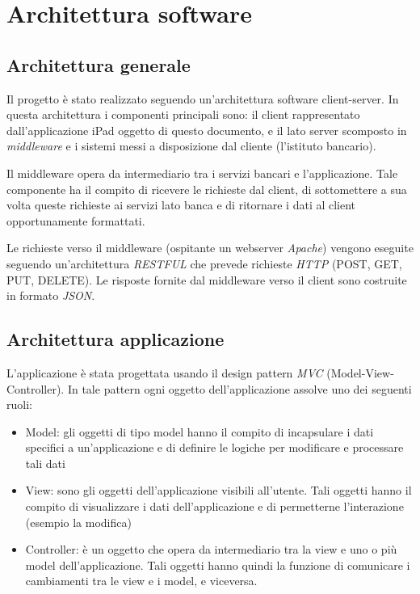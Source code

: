 \chapter{Architettura software}


\section{Architettura generale}

Il progetto è stato realizzato seguendo un'architettura software client-server. In questa architettura i componenti principali sono: il client rappresentato dall'applicazione iPad oggetto di questo documento, e il lato server scomposto in \emph{middleware} e i sistemi messi a disposizione dal cliente (l'istituto bancario).

Il middleware opera da intermediario tra i servizi bancari e l'applicazione. Tale componente ha il compito di ricevere le richieste dal client, di sottomettere a sua volta queste richieste ai servizi lato banca e di ritornare i dati al client opportunamente formattati.

Le richieste verso il middleware (ospitante un webserver \emph{Apache}) vengono eseguite seguendo un'architettura \emph{RESTFUL}  che prevede richieste \emph{HTTP} (POST, GET, PUT, DELETE). Le risposte fornite dal middleware verso il client sono costruite in formato \emph{JSON}.

\section{Architettura applicazione}

L'applicazione è stata progettata usando il design pattern \emph{MVC} (Model-View-Controller). In tale pattern ogni oggetto dell'applicazione assolve uno dei seguenti ruoli:
\begin{itemize}
 \item Model: gli oggetti di tipo model hanno il compito di incapsulare i dati specifici a un'applicazione e di definire le logiche per modificare e processare tali dati
 \item View: sono gli oggetti dell'applicazione visibili all'utente. Tali oggetti hanno il compito di visualizzare i dati dell'applicazione e di permetterne l'interazione (esempio la modifica)
 \item Controller: è un oggetto che opera da intermediario tra la view e uno o più model dell'applicazione. Tali oggetti hanno quindi la funzione di comunicare i cambiamenti tra le view e i model, e viceversa.
\end{itemize}

